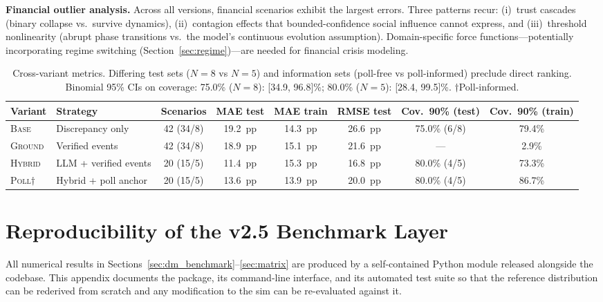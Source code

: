 \documentclass[12pt]{article}
\begin{document}
\textbf{Financial outlier analysis.} Across all versions, financial scenarios exhibit the largest errors. Three patterns recur: (i)~trust cascades (binary collapse vs.\ survive dynamics), (ii)~contagion effects that bounded-confidence social influence cannot express, and (iii)~threshold nonlinearity (abrupt phase transitions vs.\ the model's continuous evolution assumption). Domain-specific force functions---potentially incorporating regime switching (Section~\ref{sec:regime})---are needed for financial crisis modeling.

\begin{table}[H]
\centering
\caption{Cross-variant metrics. Differing test sets ($N=8$ vs $N=5$) and information sets (poll-free vs poll-informed) preclude direct ranking. Binomial 95\% CIs on coverage: 75.0\% ($N=8$): [34.9, 96.8]\%; 80.0\% ($N=5$): [28.4, 99.5]\%. $\dagger$Poll-informed.}
\label{tab:versions}
\begin{adjustbox}{max width=\textwidth}
\begin{tabular}{@{}llcccccc@{}}
\toprule
Variant & Strategy & Scenarios & MAE test & MAE train & RMSE test & Cov.\ 90\% (test) & Cov.\ 90\% (train) \\
\midrule
\textsc{Base}    & Discrepancy only      & 42 (34/8) & 19.2~pp & 14.3~pp & 26.6~pp & 75.0\% (6/8) & 79.4\% \\
\textsc{Ground}  & Verified events  & 42 (34/8) & 18.9~pp & 15.1~pp & 21.6~pp & --- & 2.9\% \\
\textsc{Hybrid}  & LLM + verified events & 20 (15/5) & 11.4~pp & 15.3~pp & 16.8~pp & 80.0\% (4/5) & 73.3\% \\
\textsc{Poll}$\dagger$ & Hybrid + poll anchor & 20 (15/5) & 13.6~pp & 13.9~pp & 20.0~pp & 80.0\% (4/5) & 86.7\% \\
\bottomrule
\end{tabular}
\end{adjustbox}
\end{table}

\section{Reproducibility of the v2.5 Benchmark Layer}
\label{app:reproducibility}

All numerical results in Sections~\ref{sec:dm_benchmark}--\ref{sec:matrix} are produced by a self-contained Python module released alongside the codebase. This appendix documents the package, its command-line interface, and its automated test suite so that the reference distribution can be rederived from scratch and any modification to the sim can be re-evaluated against it.
\end{document}
